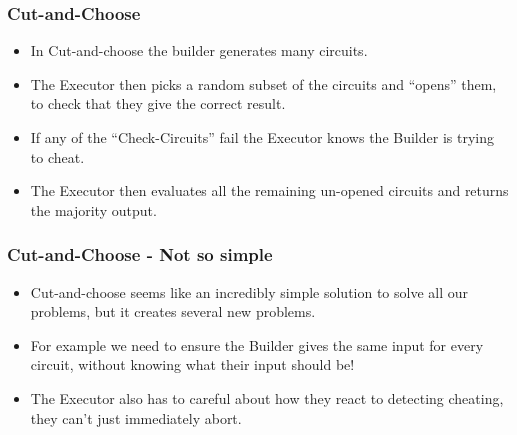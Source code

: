 \documentclass{beamer}
\begin{document}
	
	\begin{frame}
		\frametitle{Cut-and-Choose}
		\begin{itemize}
			\item In Cut-and-choose the builder generates many circuits.
			\item The Executor then picks a random subset of the circuits and ``opens'' them, to check that they give the correct result.
			\item If any of the ``Check-Circuits'' fail the Executor knows the Builder is trying to cheat.
			\item The Executor then evaluates all the remaining un-opened circuits and returns the majority output.
		\end{itemize}
	\end{frame}

	
	\begin{frame}
		\frametitle{Cut-and-Choose - Not so simple}
		\begin{itemize}
			\item Cut-and-choose seems like an incredibly simple solution to solve all our problems, but it creates several new problems.
			\item For example we need to ensure the Builder gives the same input for every circuit, without knowing what their input should be!
			\item The Executor also has to careful about how they react to detecting cheating, they can't just immediately abort.
		\end{itemize}
	\end{frame}
\end{document}
